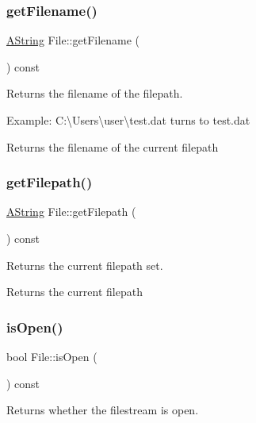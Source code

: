 \subsubsection{\texorpdfstring{getFilename()}{getFilename()}}
{\footnotesize\ttfamily \mbox{\hyperlink{class_a_string}{A\+String}} File\+::get\+Filename (\begin{DoxyParamCaption}{ }\end{DoxyParamCaption}) const}



Returns the filename of the filepath. 

Example\+: C\+:\textbackslash{}Users\textbackslash{}user\textbackslash{}test.\+dat turns to test.\+dat

\begin{DoxyReturn}{Returns}
the filename of the current filepath 
\end{DoxyReturn}
\mbox{\label{class_file_a033178594e2a60e489d7ab2936676e90}} 
\subsubsection{\texorpdfstring{getFilepath()}{getFilepath()}}
{\footnotesize\ttfamily \mbox{\hyperlink{class_a_string}{A\+String}} File\+::get\+Filepath (\begin{DoxyParamCaption}{ }\end{DoxyParamCaption}) const}



Returns the current filepath set. 

\begin{DoxyReturn}{Returns}
the current filepath 
\end{DoxyReturn}
\mbox{\label{class_file_abb0ce5b71ecf6fbaa538a812a622fc10}} 
\subsubsection{\texorpdfstring{isOpen()}{isOpen()}}
{\footnotesize\ttfamily bool File\+::is\+Open (\begin{DoxyParamCaption}{ }\end{DoxyParamCaption}) const}



Returns whether the filestream is open. 

